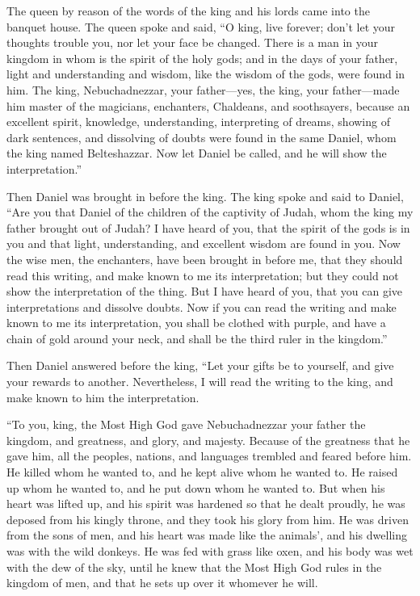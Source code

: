  The queen by reason of the words of the king and his lords
came into the banquet house. The queen spoke and said, ``O king, live
forever; don't let your thoughts trouble you, nor let your face be
changed.  There is a man in your kingdom in whom is the
spirit of the holy gods; and in the days of your father, light and
understanding and wisdom, like the wisdom of the gods, were found in
him. The king, Nebuchadnezzar, your father---yes, the king, your
father---made him master of the magicians, enchanters, Chaldeans, and
soothsayers,  because an excellent spirit, knowledge,
understanding, interpreting of dreams, showing of dark sentences, and
dissolving of doubts were found in the same Daniel, whom the king named
Belteshazzar. Now let Daniel be called, and he will show the
interpretation.''

 Then Daniel was brought in before the king. The king spoke
and said to Daniel, ``Are you that Daniel of the children of the
captivity of Judah, whom the king my father brought out of Judah?
 I have heard of you, that the spirit of the gods is in you
and that light, understanding, and excellent wisdom are found in you.
 Now the wise men, the enchanters, have been brought in
before me, that they should read this writing, and make known to me its
interpretation; but they could not show the interpretation of the thing.
 But I have heard of you, that you can give interpretations
and dissolve doubts. Now if you can read the writing and make known to
me its interpretation, you shall be clothed with purple, and have a
chain of gold around your neck, and shall be the third ruler in the
kingdom.''

 Then Daniel answered before the king, ``Let your gifts be
to yourself, and give your rewards to another. Nevertheless, I will read
the writing to the king, and make known to him the interpretation.

 ``To you, king, the Most High God gave Nebuchadnezzar your
father the kingdom, and greatness, and glory, and majesty. 
Because of the greatness that he gave him, all the peoples, nations, and
languages trembled and feared before him. He killed whom he wanted to,
and he kept alive whom he wanted to. He raised up whom he wanted to, and
he put down whom he wanted to.  But when his heart was
lifted up, and his spirit was hardened so that he dealt proudly, he was
deposed from his kingly throne, and they took his glory from him.
 He was driven from the sons of men, and his heart was made
like the animals', and his dwelling was with the wild donkeys. He was
fed with grass like oxen, and his body was wet with the dew of the sky,
until he knew that the Most High God rules in the kingdom of men, and
that he sets up over it whomever he will.

